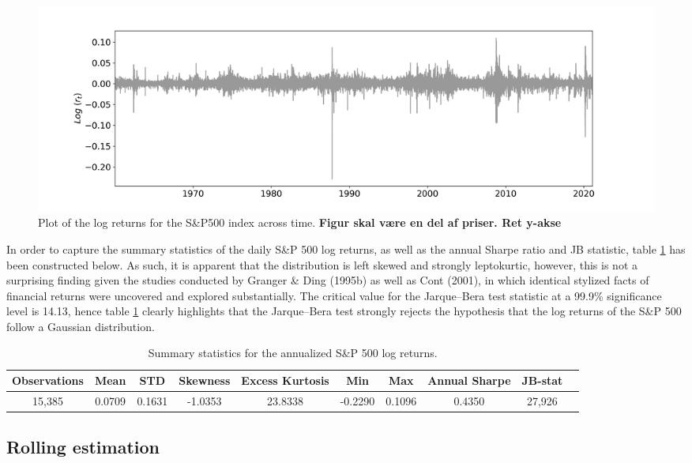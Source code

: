 \begin{figure}[H] 
    \centering
    \includegraphics[width=1\textwidth]{analysis/data_description/images/SP500_log_returns.png}
    \caption [Plot of the log returns for the S\&P500 index across time] {Plot of the log returns for the S\&P500 index across time. \textbf{Figur skal være en del af priser. Ret y-akse}}
    \label{fig: log_returns_all_indices}
\end{figure}

In order to capture the summary statistics of the daily S\&P 500 log returns, as well as the annual Sharpe ratio and JB statistic, table \ref{tab:summary_stats_S&P500} has been constructed below. As such, it is apparent that the distribution is left skewed and strongly leptokurtic, however, this is not a surprising finding given the studies conducted by Granger \& Ding (1995b) as well as Cont (2001), in which identical stylized facts of financial returns were uncovered and explored substantially. The critical value for the Jarque–Bera test statistic at a 99.9\% significance level is 14.13, hence table \ref{tab:summary_stats_S&P500} clearly highlights that the Jarque–Bera test strongly rejects the hypothesis that the log returns of the S\&P 500 follow a Gaussian distribution.

\begin{table}[H]
\small
\caption{Summary statistics for the annualized S\&P 500 log returns.}
\centering
\begin{tabular}{c c c c c c c c c c} 
\hline\hline
Observations & Mean & STD & Skewness & Excess Kurtosis & Min & Max & Annual Sharpe & JB-stat \\
\hline
15,385 & 0.0709 & 0.1631 & -1.0353 & 23.8338 & -0.2290 & 0.1096 & 0.4350 & 27,926 \\
\hline
\end{tabular}
\label{tab:summary_stats_S&P500}
\end{table}
 

\subsection{Rolling estimation}
\label{Sec: rolling estimation}

